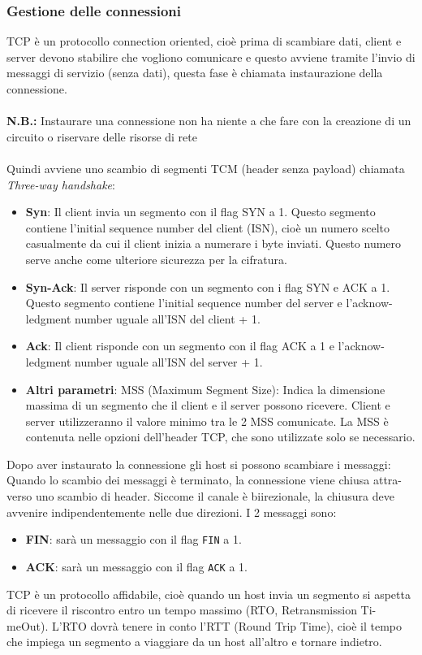\documentclass[a4paper]{article}
\begin{document}
\subsubsection{Gestione delle connessioni}
TCP è un protocollo connection oriented, cioè prima di scambiare dati, client 
e server devono stabilire che vogliono comunicare e questo avviene tramite 
l’invio di messaggi di servizio (senza dati), questa fase è chiamata 
instaurazione della connessione.
\\\\
\textbf{N.B.:} Instaurare una connessione non ha niente a che fare con la creazione di un circuito o riservare delle risorse di rete
\\\\
Quindi avviene uno scambio di segmenti TCM (header senza payload) chiamata \textit{Three-way handshake}:
\begin{itemize}

  \item \textbf{Syn}: Il client invia un segmento con il flag SYN a 1. Questo segmento contiene l’initial sequence number del client (ISN), cioè un numero scelto casualmente da cui il client inizia a numerare i byte inviati. Questo numero serve anche come ulteriore sicurezza per la cifratura.
  \item \textbf{Syn-Ack}: Il server risponde con un segmento con i flag SYN e ACK a 1. Questo segmento contiene l’initial sequence number del server e l’acknow- ledgment number uguale all’ISN del client + 1.
  \item \textbf{Ack}: Il client risponde con un segmento con il flag ACK a 1 e l’acknow- ledgment number uguale all’ISN del server + 1.
  \item \textbf{Altri parametri}: MSS (Maximum Segment Size): Indica la dimensione massima di un segmento che il client e il server possono ricevere. Client e server utilizzeranno il valore minimo tra le 2 MSS comunicate. La MSS è contenuta nelle opzioni dell’header TCP, che sono utilizzate solo se necessario.
\end{itemize}
Dopo aver instaurato la connessione gli host si possono scambiare i messaggi: Quando lo scambio dei messaggi è terminato, la connessione viene chiusa attra- verso uno scambio di header. Siccome il canale è biirezionale, la chiusura deve avvenire indipendentemente nelle due direzioni. I 2 messaggi sono:
\begin{itemize}
  \item \textbf{FIN}: sarà un messaggio con il flag \texttt{FIN} a 1.
  \item \textbf{ACK}: sarà un messaggio con il flag \texttt{ACK} a 1.
\end{itemize}
TCP è un protocollo affidabile, cioè quando un host invia un segmento si aspetta di ricevere il riscontro entro un tempo massimo (RTO, Retransmission Ti- meOut). L’RTO dovrà tenere in conto l’RTT (Round Trip Time), cioè il tempo che impiega un segmento a viaggiare da un host all’altro e tornare indietro.
\end{document}
